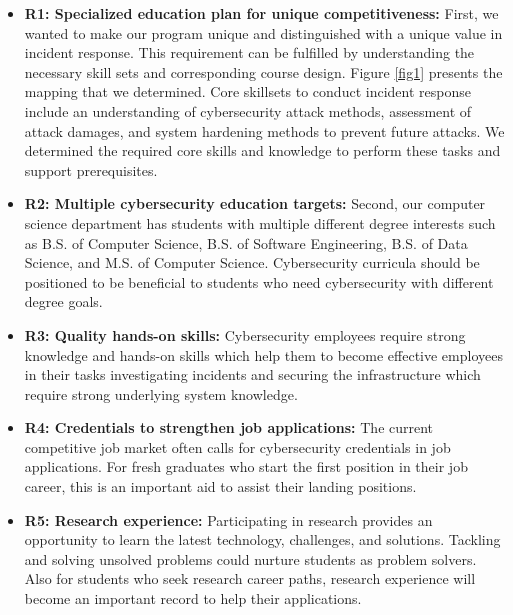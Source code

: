 \documentclass{article}
\begin{document}
\begin{itemize}
    
\item \textbf{R1: Specialized education plan for unique competitiveness:} First, we wanted to make our program unique and distinguished with a unique value in incident response. This requirement can be fulfilled by understanding the necessary skill sets and corresponding course design. Figure \ref{fig1} presents the mapping that we determined. Core skillsets to conduct incident response include an understanding of cybersecurity attack methods, assessment of attack damages, and system hardening methods to prevent future attacks. We determined the required core skills and knowledge to perform these tasks and support prerequisites.

\item \textbf{R2: Multiple cybersecurity education targets:} Second, our computer science department has students with multiple different degree interests such as B.S. of Computer Science, B.S. of Software Engineering, B.S. of Data Science, and M.S. of Computer Science. Cybersecurity curricula should be positioned to be beneficial to students who need cybersecurity with different degree goals.


\item \textbf{R3: Quality hands-on skills:} 
Cybersecurity employees require strong knowledge and hands-on skills which help them to become effective employees in their tasks investigating incidents and securing the infrastructure which require strong underlying system knowledge. 

\item \textbf{R4: Credentials to strengthen job applications:} 
The current competitive job market often calls for cybersecurity credentials in job applications. For fresh graduates who start the first position in their job career, this is an important aid to assist their landing positions.

\item \textbf{R5: Research experience:} Participating in research provides an opportunity to learn the latest technology, challenges, and solutions. Tackling and solving unsolved problems could nurture students as problem solvers. Also for students who seek research career paths, research experience will become an important record to help their applications.

\end{itemize}
\end{document}
